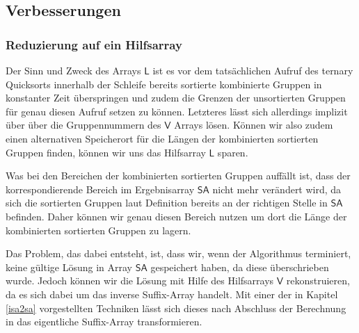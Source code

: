 \subsection{Verbesserungen}
\subsubsection{Reduzierung auf ein Hilfsarray}
Der Sinn und Zweck des Arrays $\mathsf{L}$ ist es vor dem tatsächlichen Aufruf des ternary Quicksorts innerhalb der Schleife bereits sortierte kombinierte Gruppen in konstanter Zeit überspringen und zudem die Grenzen der unsortierten Gruppen für genau diesen Aufruf setzen zu können. Letzteres lässt sich allerdings implizit über über die Gruppennummern des $\mathsf{V}$ Arrays lösen. Können wir also zudem einen alternativen Speicherort für die Längen der kombinierten sortierten Gruppen finden, können wir uns das Hilfsarray $\mathsf{L}$ sparen.

Was bei den Bereichen der kombinierten sortierten Gruppen auffällt ist, dass der korrespondierende Bereich im Ergebnisarray $\mathsf{SA}$ nicht mehr verändert wird, da sich die sortierten Gruppen laut Definition bereits an der richtigen Stelle in $\mathsf{SA}$ befinden. Daher können wir genau diesen Bereich nutzen um dort die Länge der kombinierten sortierten Gruppen zu lagern.

Das Problem, das dabei entsteht, ist, dass wir, wenn der Algorithmus terminiert, keine gültige Lösung in Array $\mathsf{SA}$ gespeichert haben, da diese überschrieben wurde. Jedoch können wir die Lösung mit Hilfe des Hilfsarrays $\mathsf{V}$ rekonstruieren, da es sich dabei um das inverse Suffix-Array handelt. Mit einer der in Kapitel \ref{isa2sa} vorgestellten Techniken lässt sich dieses nach Abschluss der Berechnung in das eigentliche Suffix-Array transformieren.



